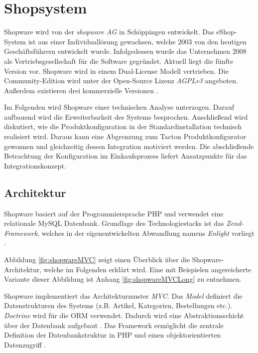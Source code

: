 \documentclass[11pt, a4paper, titlepage, listof=totoc, bibliography=totoc, index=totoc, twoside, openright, headings=normal]{scrreprt}
\begin{document}
\section{Shopsystem}
\label{Shopsystem}

Shopware wird von der \emph{shopware AG} in Schöppingen entwickelt. Das eShop-System ist aus einer Individuallösung gewachsen, welche 2003 von den heutigen Geschäftsführern entwickelt wurde. Infolgedessen wurde das Unternehmen 2008 als Vertriebsgesellschaft für die Software gegründet. Aktuell liegt die fünfte Version vor. Shopware wird in einem Dual-License Modell vertrieben. Die Community-Edition wird unter der \citeauthor{gnuAGPLv3} Open-Source Lizenz \emph{AGPLv3} angeboten. Außerdem existieren drei kommerzielle Versionen \citep{shopwareUnternehmen}.

Im Folgenden wird Shopware einer technischen Analyse unterzogen. Darauf aufbauend wird die Erweiterbarkeit des Systems besprochen. Anschließend wird diskutiert, wie die Produktkonfiguration in der Standardinstallation technisch realisiert wird. Daraus kann eine Abgrenzung zum Tacton Produktkonfigurator gewonnen und gleichzeitig dessen Integration motiviert werden. Die abschließende Betrachtung der Konfiguration im Einkaufsprozess liefert Ansatzpunkte für das Integrationskonzept.

\subsection{Architektur}
\label{shopwareArchitektur}
Shopware basiert auf der Programmiersprache PHP und verwendet eine relationale MySQL Datenbank. Grundlage des Technologiestacks ist das \emph{Zend-Framework}, welches in der eigenentwickelten Abwandlung namens \emph{Enlight} vorliegt \citep{shopware5Docs}.

Abbildung \ref{fig:shopwareMVC} zeigt einen Überblick über die Shopware-Architektur, welche im Folgenden erklärt wird. Eine mit Beispielen angereicherte Variante dieser Abbildung ist Anhang \ref{fig:shopwareMVCLong} zu entnehmen.

Shopware implementiert das Architekturmuster \emph{\ac{MVC}}. Das \emph{Model} definiert die Datenstrukturen des Systems (z.B. Artikel, Kategorien, Bestellungen etc.). \emph{Doctrine} wird für die \ac{ORM} verwendet. Dadurch wird eine Abstraktionsschicht über der Datenbank aufgebaut \citep{shopware5Docs}. Das Framework ermöglicht die zentrale Definition der Datenbankstruktur in PHP und einen objektorientierten Datenzugriff \citep{shopware4Docs}.
\end{document}
